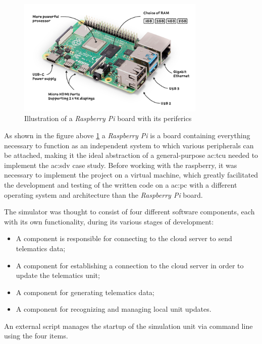 \begin{figure}[h]  %
    \centering
    \includegraphics[width=0.8\textwidth]{images/raspberrypi.png}  %
    \caption{Illustration of a \textit{Raspberry Pi} board with its periferics \cite{raspberrypi}}
    \label{fig:raspberrypi}
\end{figure}

As shown in the figure above \ref{fig:raspberrypi} a \textit{Raspberry Pi} is a board containing everything necessary to function as an independent system to which various peripherals can be attached, making it the ideal abstraction of a general-purpose \gls{ac:tcu} needed to implement the \gls{ac:sdv} case study.
Before working with the raspberry, it was necessary to implement the project on a virtual machine, which greatly facilitated the development and testing of the written code on a \gls{ac:pc} with a different operating system and architecture than the \textit{Raspberry Pi} board.

The simulator was thought to consist of four different software components, each with its own functionality, during its various stages of development:
\begin{itemize}
    \item A component is responsible for connecting to the cloud server to send telematics data;
    \item A component for establishing a connection to the cloud server in order to update the telematics unit;
    \item A component for generating telematics data;
    \item A component for recognizing and managing local unit updates.
\end{itemize}
An external script manages the startup of the simulation unit via command line using the four items. 


